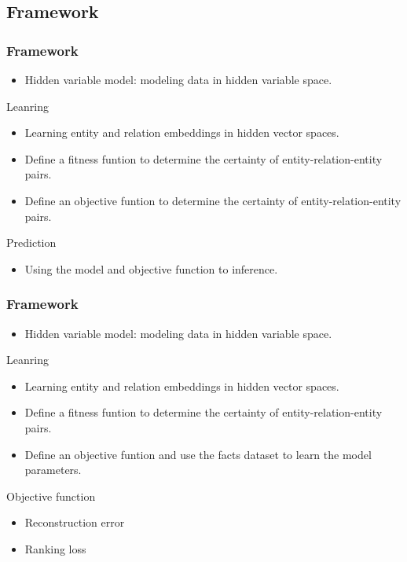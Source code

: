 \documentclass[pdf,10pt]{beamer}
\begin{document}
\subsection{Framework}
\begin{frame}
	\frametitle{Framework}
	\begin{itemize}
		\item Hidden variable model: modeling data in hidden variable space.
	\end{itemize}
	\begin{block}{Leanring}
		\begin{itemize}
			\item Learning entity and relation embeddings in hidden vector spaces.
			\item Define a fitness funtion to determine the certainty of entity-relation-entity pairs.
			\item Define an objective funtion to determine the certainty of entity-relation-entity pairs.
		\end{itemize}
	\end{block}
	\begin{alertblock}{Prediction}
		\begin{itemize}
			\item Using the model and objective function to inference.
		\end{itemize}
	\end{alertblock}
\end{frame}

\begin{frame}
	\frametitle{Framework}
	\begin{itemize}
		\item Hidden variable model: modeling data in hidden variable space.
	\end{itemize}
	\begin{block}{Leanring}
		\begin{itemize}
			\item Learning entity and relation embeddings in hidden vector spaces.
			\item Define a fitness funtion to determine the certainty of entity-relation-entity pairs.
			\item Define an objective funtion and use the facts dataset to learn the model parameters.
		\end{itemize}
	\end{block}
	\begin{alertblock}{Objective function}
		\begin{itemize}
			\item Reconstruction error
			\item Ranking loss
		\end{itemize}
	\end{alertblock}
\end{frame}
\end{document}
